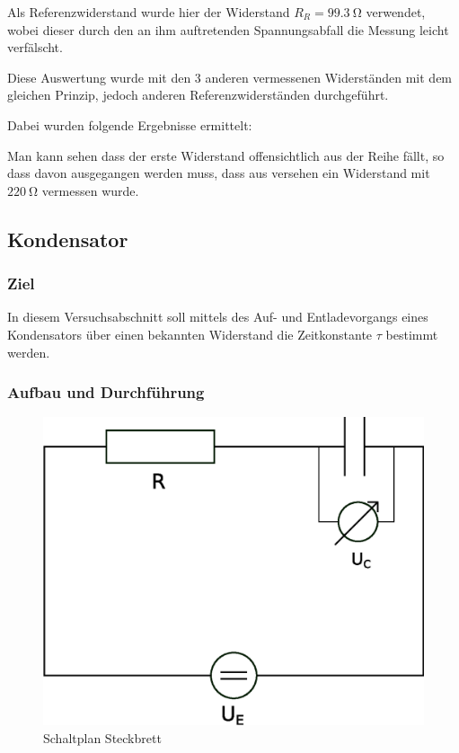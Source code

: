 \documentclass[12pt,twoside,a4paper]{scrartcl}
\begin{document}
				Als Referenzwiderstand wurde hier der Widerstand $R_R = \SI{99.3}{\ohm}$ verwendet, wobei dieser durch den an ihm auftretenden Spannungsabfall die Messung leicht verfälscht.

				Diese Auswertung wurde mit den 3 anderen vermessenen Widerständen mit dem gleichen Prinzip, jedoch anderen Referenzwiderständen durchgeführt.

				Dabei wurden folgende Ergebnisse ermittelt:

					

				Man kann sehen dass der erste Widerstand offensichtlich aus der Reihe fällt, so dass davon ausgegangen werden muss, dass aus versehen ein Widerstand mit $\SI{220}{\ohm}$ vermessen wurde.


		\subsection{Kondensator}
			\subsubsection{Ziel}
				In diesem Versuchsabschnitt soll mittels des Auf- und Entladevorgangs eines Kondensators über einen bekannten Widerstand die Zeitkonstante $\tau$ bestimmt werden.

			\subsubsection{Aufbau und Durchführung}

			\begin{figure}[H]
				\centering

				\includegraphics[width = 0.8 \textwidth]{Pictures/capacitance}

				\caption{Schaltplan Steckbrett}
			\end{figure}
\end{document}
